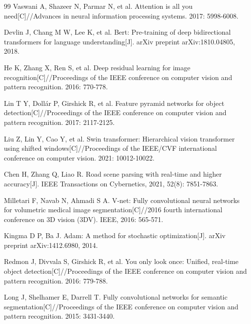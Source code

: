 \begin{thebibliography}{99}
Vaswani A, Shazeer N, Parmar N, et al. Attention is all you need[C]//Advances in neural information processing systems. 2017: 5998-6008.

Devlin J, Chang M W, Lee K, et al. Bert: Pre-training of deep bidirectional transformers for language understanding[J]. arXiv preprint arXiv:1810.04805, 2018.

He K, Zhang X, Ren S, et al. Deep residual learning for image recognition[C]//Proceedings of the IEEE conference on computer vision and pattern recognition. 2016: 770-778.

Lin T Y, Dollár P, Girshick R, et al. Feature pyramid networks for object detection[C]//Proceedings of the IEEE conference on computer vision and pattern recognition. 2017: 2117-2125.

Liu Z, Lin Y, Cao Y, et al. Swin transformer: Hierarchical vision transformer using shifted windows[C]//Proceedings of the IEEE/CVF international conference on computer vision. 2021: 10012-10022.

Chen H, Zhang Q, Liao R. Road scene parsing with real-time and higher accuracy[J]. IEEE Transactions on Cybernetics, 2021, 52(8): 7851-7863.

Milletari F, Navab N, Ahmadi S A. V-net: Fully convolutional neural networks for volumetric medical image segmentation[C]//2016 fourth international conference on 3D vision (3DV). IEEE, 2016: 565-571.

Kingma D P, Ba J. Adam: A method for stochastic optimization[J]. arXiv preprint arXiv:1412.6980, 2014.

Redmon J, Divvala S, Girshick R, et al. You only look once: Unified, real-time object detection[C]//Proceedings of the IEEE conference on computer vision and pattern recognition. 2016: 779-788.

Long J, Shelhamer E, Darrell T. Fully convolutional networks for semantic segmentation[C]//Proceedings of the IEEE conference on computer vision and pattern recognition. 2015: 3431-3440.

\end{thebibliography}
